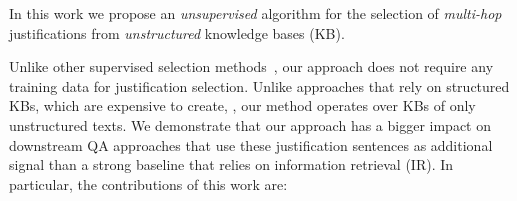 In this work we propose an {\em unsupervised} algorithm for the selection of {\em multi-hop} justifications from {\em unstructured} knowledge bases (KB). 

Unlike other supervised selection methods~\cite{dehghani2019learning, bao2016constraint, lin2018denoising, wang2018multi, wang2018evidence,tran2018multihop, trivedi2019repurposing}, our approach does not require any training data for justification selection. Unlike approaches that rely on structured KBs, which are expensive to create, \cite{khashabi2016question, khot2017answering, Zhang2018KG2LT, khashabi2018question, cui2017kbqa, bao2016constraint}, our method operates over KBs of only unstructured texts. We demonstrate that our approach has a bigger impact on downstream QA approaches that use these justification sentences as additional signal than a strong baseline that relies on information retrieval (IR). In particular, the contributions of this work are:

